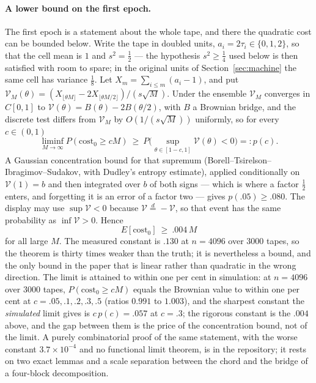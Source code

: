 \documentclass[11pt]{article}
\begin{document}
\paragraph{A lower bound on the first epoch.} The first epoch is a statement about the whole tape,
and there the quadratic cost can be bounded below. Write the tape in doubled units,
$a_i=2\tau_i\in\{0,1,2\}$, so that the cell mean is $1$ and $s^2=\tfrac12$ --- the hypothesis
$s^2\ge\tfrac14$ used below is then satisfied with room to spare; in the original units of
Section~\ref{sec:machine} the same cell has variance $\tfrac18$. Let $X_m=\sum_{i\le m}(a_i-1)$, and put $\mathcal V_M(\theta)=(X_{\lfloor\theta M\rfloor}-2X_{\lfloor\theta M/2\rfloor})/(s\sqrt M)$.
Under the ensemble $\mathcal V_M$ converges in $C[0,1]$ to $\mathcal V(\theta)=B(\theta)-2B(\theta/2)$,
with $B$ a Brownian bridge, and the discrete test differs from $\mathcal V_M$ by $O(1/(s\sqrt M))$
uniformly, so for every $c\in(0,1)$
\[
\liminf_{M\to\infty}P(\mathrm{cost}_0\ge cM)\ \ge\ P\Big(\sup_{\theta\in[1-c,1]}\mathcal V(\theta)<0\Big)=:p(c).
\]
A Gaussian concentration bound for that supremum (Borell--Tsirelson--Ibragimov--Sudakov, with
Dudley's entropy estimate), applied conditionally on $\mathcal V(1)=b$ and then integrated over $b$ of
both signs --- which is where a factor $\tfrac12$ enters, and forgetting it is an error of a factor
two --- gives $p(.05)\ge.080$. The display may use $\sup\mathcal V<0$ because
$\mathcal V\stackrel{d}{=}-\mathcal V$, so that event has the same probability as
$\inf\mathcal V>0$. Hence
\[
E[\mathrm{cost}_0]\ \ge\ .004\,M
\]
for all large $M$. The measured constant is $.130$ at $n=4096$ over $3000$ tapes, so the theorem is
thirty times weaker than the truth; it is nevertheless a bound, and the only bound in the paper that
is linear rather than quadratic in the wrong direction.
The limit is attained to within one per cent in simulation: at $n=4096$ over $3000$ tapes, $P(\mathrm{cost}_0\ge cM)$ equals the
Brownian value to within one per cent at $c=.05,.1,.2,.3,.5$ (ratios $0.991$ to $1.003$), and the
sharpest constant the \emph{simulated} limit gives is $c\,p(c)=.057$ at $c=.3$; the rigorous constant
is the $.004$ above, and the gap between them is the price of the concentration bound, not of the
limit. A purely combinatorial proof of the
same statement, with the worse constant $3.7\times10^{-4}$ and no functional limit theorem, is in
the repository; it rests on two exact lemmas and a scale separation between the chord and the
bridge of a four-block decomposition.
\end{document}
